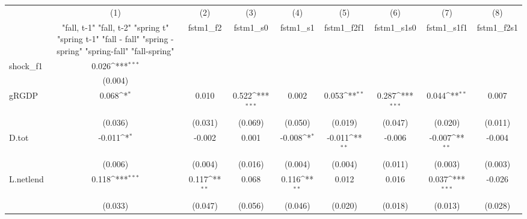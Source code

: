 {
\def\sym#1{\ifmmode^{#1}\else\(^{#1}\)\fi}
\begin{tabular}{l*{8}{c}}
\toprule
            &\multicolumn{1}{c}{(1)}&\multicolumn{1}{c}{(2)}&\multicolumn{1}{c}{(3)}&\multicolumn{1}{c}{(4)}&\multicolumn{1}{c}{(5)}&\multicolumn{1}{c}{(6)}&\multicolumn{1}{c}{(7)}&\multicolumn{1}{c}{(8)}\\
            &\multicolumn{1}{c}{  "fall, t-1" "fall, t-2" "spring t" "spring t-1"  "fall - fall" "spring - spring" "spring-fall" "fall-spring" }&\multicolumn{1}{c}{fstm1\_f2}&\multicolumn{1}{c}{fstm1\_s0}&\multicolumn{1}{c}{fstm1\_s1}&\multicolumn{1}{c}{fstm1\_f2f1}&\multicolumn{1}{c}{fstm1\_s1s0}&\multicolumn{1}{c}{fstm1\_s1f1}&\multicolumn{1}{c}{fstm1\_f2s1}\\
\midrule
shock\_f1    &       0.026\sym{***}&                     &                     &                     &                     &                     &                     &                     \\
            &     (0.004)         &                     &                     &                     &                     &                     &                     &                     \\
\addlinespace
gRGDP       &       0.068\sym{*}  &       0.010         &       0.522\sym{***}&       0.002         &       0.053\sym{**} &       0.287\sym{***}&       0.044\sym{**} &       0.007         \\
            &     (0.036)         &     (0.031)         &     (0.069)         &     (0.050)         &     (0.019)         &     (0.047)         &     (0.020)         &     (0.011)         \\
\addlinespace
D.tot       &      -0.011\sym{*}  &      -0.002         &       0.001         &      -0.008\sym{*}  &      -0.011\sym{**} &      -0.006         &      -0.007\sym{**} &      -0.004         \\
            &     (0.006)         &     (0.004)         &     (0.016)         &     (0.004)         &     (0.004)         &     (0.011)         &     (0.003)         &     (0.003)         \\
\addlinespace
L.netlend   &       0.118\sym{***}&       0.117\sym{**} &       0.068         &       0.116\sym{**} &       0.012         &       0.016         &       0.037\sym{***}&      -0.026         \\
            &     (0.033)         &     (0.047)         &     (0.056)         &     (0.046)         &     (0.020)         &     (0.018)         &     (0.013)         &     (0.028)         \\

\end{tabular}}
